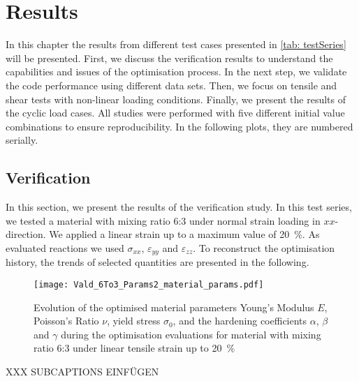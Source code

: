     \chapter{Results}\label{chap: results}

In this chapter the results from different test cases presented in \autoref{tab: testSeries} will be presented. First, we discuss the verification results to understand the capabilities and issues of the optimisation process. In the next step, we validate the code performance using different data sets. Then, we focus on tensile and shear tests with non-linear loading conditions. 
Finally, we present the results of the cyclic load cases. All studies were performed with five different initial value combinations to ensure reproducibility. In the following plots, they are numbered serially. 


\section{Verification}\label{sec: verification}

In this section, we present the results of the verification study. In this test series, we tested a material with mixing ratio 6:3 under normal strain loading in $xx$-direction.
We applied a linear strain up to a maximum value of 20 \%. As evaluated reactions we used $\sigma_{xx}$, $\varepsilon_{yy}$ and $\varepsilon_{zz}$. To reconstruct the optimisation history, the trends of selected quantities are presented in the following.

\begin{figure}[H]
    \centering
    \texttt{[image: Vald\_6To3\_Params2\_material\_params.pdf]}
    \caption{Evolution of the optimised material parameters Young's Modulus $E$, Poisson's Ratio $\nu$, yield stress $\sigma_0$, and the hardening coefficients $\alpha$, $\beta$ and $\gamma$ during the optimisation evaluations for material with mixing ratio 6:3 under linear tensile strain up to 20 \%}
    \label{fig:verifMaterialParams}
\end{figure}

XXX SUBCAPTIONS EINFÜGEN

